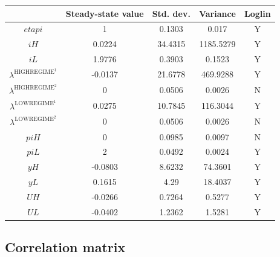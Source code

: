 \begin{tabular}{c|c|c|c|c|}
  & Steady-state value & Std. dev. & Variance & Loglin\\
\hline
${e\!t\!a\!p\!i}$ & 1 & 0.1303 & 0.017 & Y    \\
${i\!H}$ & 0.0224 & 34.4315 & 1185.5279 & Y    \\
${i\!L}$ & 1.9776 & 0.3903 & 0.1523 & Y    \\
$\lambda^{\mathrm{HIGHREGIME}^{\mathrm{1}}}$ & -0.0137 & 21.6778 & 469.9288 & Y    \\
$\lambda^{\mathrm{HIGHREGIME}^{\mathrm{2}}}$ & 0 & 0.0506 & 0.0026 & N    \\
$\lambda^{\mathrm{LOWREGIME}^{\mathrm{1}}}$ & 0.0275 & 10.7845 & 116.3044 & Y    \\
$\lambda^{\mathrm{LOWREGIME}^{\mathrm{2}}}$ & 0 & 0.0506 & 0.0026 & N    \\
${p\!i\!H}$ & 0 & 0.0985 & 0.0097 & N    \\
${p\!i\!L}$ & 2 & 0.0492 & 0.0024 & Y    \\
${y\!H}$ & -0.0803 & 8.6232 & 74.3601 & Y    \\
${y\!L}$ & 0.1615 & 4.29 & 18.4037 & Y    \\
${U\!H}$ & -0.0266 & 0.7264 & 0.5277 & Y    \\
${U\!L}$ & -0.0402 & 1.2362 & 1.5281 & Y    \\
\hline
\end{tabular}


\subsection{Correlation matrix}

